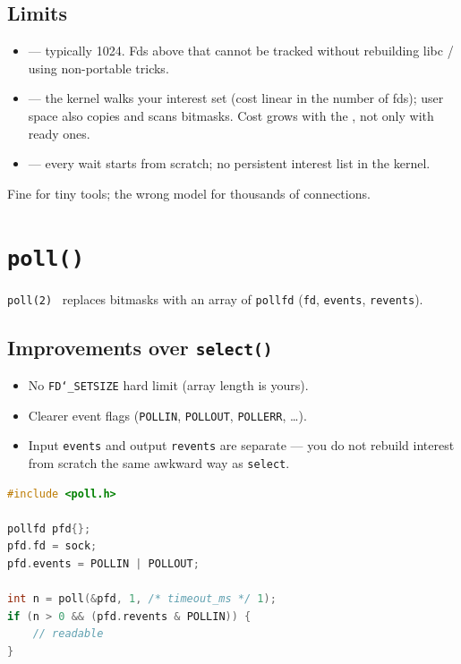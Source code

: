 \subsection{Limits}
\label{subsec:select-limits}
\begin{itemize}
    \item {} --- typically 1024. Fds above that cannot be 
          tracked without rebuilding libc / using non-portable tricks.
    \item {} --- the kernel walks your interest set (cost linear in the 
          number of fds); user space also copies and scans bitmasks. Cost grows with the 
          , not only with ready ones.
    \item {} --- every wait starts from scratch; no persistent 
          interest list in the kernel.
\end{itemize}
Fine for tiny tools; the wrong model for thousands of connections.

\section{\texttt{poll()}}
\label{sec:poll}
\texttt{poll(2)}~\cite{man-poll} replaces bitmasks with an array of \texttt{pollfd} 
(\texttt{fd}, \texttt{events}, \texttt{revents}).

\subsection{Improvements over \texttt{select()}}
\label{subsec:poll-improvements}
\begin{itemize}
    \item No \texttt{FD\char`_SETSIZE} hard limit (array length is yours).
    \item Clearer event flags (\texttt{POLLIN}, \texttt{POLLOUT}, \texttt{POLLERR}, \ldots).
    \item Input \texttt{events} and output \texttt{revents} are separate --- you do not rebuild 
          interest from scratch the same awkward way as \texttt{select}.
\end{itemize}
\begin{lstlisting}[language=C++]
#include <poll.h>

pollfd pfd{};
pfd.fd = sock;
pfd.events = POLLIN | POLLOUT;

int n = poll(&pfd, 1, /* timeout_ms */ 1);
if (n > 0 && (pfd.revents & POLLIN)) {
    // readable
}
\end{lstlisting}

